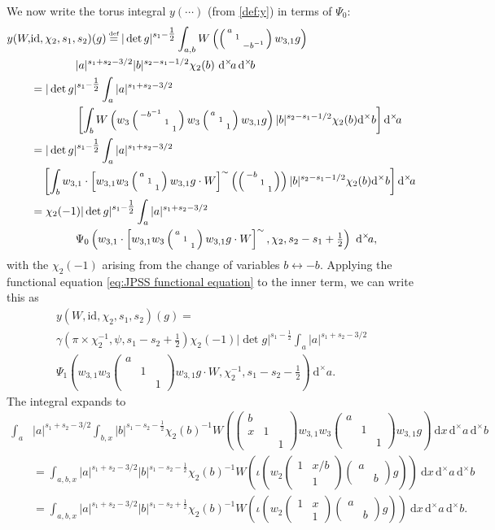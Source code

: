 \documentclass[10pt,reqno,a4paper]{amsart}
\newcommand{\stbt}[4]{\left(\begin{smallmatrix}#1 & #2\\#3&#4\end{smallmatrix}\right)}
\newcommand{\sdthree}[3]{\left(\begin{smallmatrix}#1 \\ & #2\\ && #3\end{smallmatrix}\right)}
\newcommand{\smallthreemat}[9]{\left(\begin{smallmatrix}
#1 & #2 & #3 \\
#4 & #5 & #6 \\
#7 & #8 & #9\end{smallmatrix}\right)}
\begin{document}
We now write the torus integral $y(\cdots)$ (from \cref{def:y}) in terms of $\Psi_0$:
\begin{align*}
y(W,& \mathrm{id}, \chi_2, s_1, s_2)(g)\defeq
|\det g|^{s_1-\tfrac{1}{2}} \int_{a,b} W\left(\sdthree{a}{1}{-b^{-1}} w_{3, 1} g\right)\\
&\hspace{40pt}|a|^{s_1 + s_2 - 3/2} |b|^{s_2 - s_1 - 1/2} \chi_2(b)\  \mathrm{d}^\times\! a\, \mathrm{d}^\times\! b \\
&= |\det g|^{s_1-\tfrac{1}{2}} \int_a |a|^{s_1 + s_2 - 3/2} \\
&\hspace{40pt}\left[ \int_b W\left(w_3 \sdthree{-b^{-1}}{1}{1} w_3 \sdthree{a}{1}{1} w_{3, 1} g\right) |b|^{s_2 - s_1 - 1/2} \chi_2(b)\mathrm{d}^\times b \right] \mathrm{d}^\times\! a\\
&= |\det g|^{s_1-\tfrac{1}{2}} \int_a |a|^{s_1 + s_2 - 3/2} \\
&\hspace{10pt}\left[ \int_b w_{3, 1} \cdot \left[ w_{3, 1} w_3 \sdthree{a}{1}{1} w_{3, 1} g \cdot W\right]^{\sim}\left( \sdthree{-b}{1}{1} \right) |b|^{s_2 - s_1 - 1/2} \chi_2(b)\mathrm{d}^\times b \right] \mathrm{d}^\times\! a\\
&= \chi_2(-1)|\det g|^{s_1-\tfrac{1}{2}} \int_a |a|^{s_1 + s_2 - 3/2}\\
&\hspace{40pt}\Psi_0\left( w_{3, 1} \cdot \left[ w_{3, 1} w_3 \sdthree{a}{1}{1} w_{3, 1} g \cdot W\right]^{\sim}, \chi_2, s_2 - s_1 + \tfrac{1}{2}\right)\ \mathrm{d}^\times\! a,
\end{align*}
with the $\chi_2(-1)$ arising from the change of variables $b \leftrightarrow -b$. Applying the functional equation \eqref{eq:JPSS functional equation} to the inner term, we can write this as
\begin{multline*}
y(W, \mathrm{id}, \chi_2, s_1, s_2)(g) =  \\
\gamma(\pi \times \chi_2^{-1},\psi, s_1 - s_2 + \tfrac{1}{2})\chi_2(-1)|\det g|^{s_1-\tfrac{1}{2}} \int_a |a|^{s_1 + s_2 - 3/2}\\
\Psi_1\left(  w_{3, 1} w_3 \sdthree{a}{1}{1} w_{3, 1} g \cdot W, \chi_2^{-1}, s_1 - s_2 - \tfrac{1}{2}\right)\ \mathrm{d}^\times a.
\end{multline*}
The integral expands to
\begin{align*}
\int_a &|a|^{s_1 + s_2 - 3/2} \int_{b,x} |b|^{s_1 - s_2 - \tfrac{1}{2}} \chi_2(b)^{-1} W\left(
\smallthreemat{b}{}{} {x}{1}{} {}{}{1}
w_{3, 1} w_3 \sdthree{a}{1}{1} w_{3, 1} g\right) \ \mathrm{d}x\, \mathrm{d}^\times\! a\, \mathrm{d}^\times\! b\\
&= \int_{a,b,x} |a|^{s_1 + s_2 - 3/2} |b|^{s_1 - s_2 - \tfrac{1}{2}} \chi_2(b)^{-1} W\left(\iota(w_2 \stbt{1}{x/b}{}{1}\stbt{a}{}{}{b} g)\right) \ \mathrm{d}x\, \mathrm{d}^\times a\, \mathrm{d}^\times b\\
&= \int_{a,b,x} |a|^{s_1 + s_2 - 3/2} |b|^{s_1 - s_2 + \tfrac{1}{2}} \chi_2(b)^{-1} W\left(\iota(w_2 \stbt{1}{x}{}{1}\stbt{a}{}{}{b} g)\right) \ \mathrm{d}x\, \mathrm{d}^\times a\, \mathrm{d}^\times b.
\end{align*}
\end{document}
